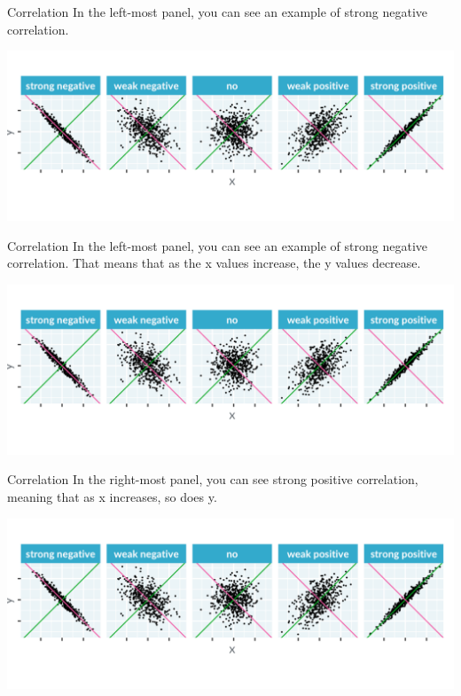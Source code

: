 \documentclass[
  ignorenonframetext,
]{beamer}
\begin{document}
\begin{frame}{Correlation}
\label{correlation-7}
In the left-most panel, you can see an example of strong negative
correlation.

\includegraphics{../images/im34.png}
\end{frame}

\begin{frame}{Correlation}
\label{correlation-8}
In the left-most panel, you can see an example of strong negative
correlation. That means that as the x values increase, the y values
decrease.

\includegraphics{../images/im34.png}
\end{frame}

\begin{frame}{Correlation}
\label{correlation-9}
In the right-most panel, you can see strong positive correlation,
meaning that as x increases, so does y.

\includegraphics{../images/im34.png}
\end{frame}
\end{document}
